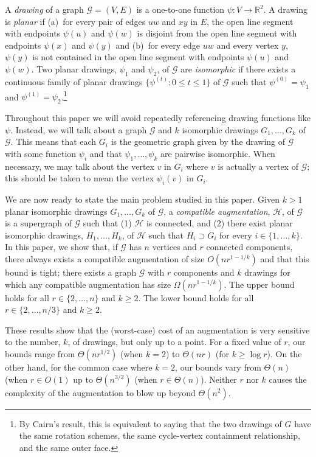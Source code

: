 \documentclass{patmorin}
\newcommand{\R}{\mathbb{R}}
\begin{document}
A \emph{drawing} of a graph $\mathcal{G}=(V,E)$ is a one-to-one
function $\psi\colon V\to\R^2$.  A drawing is \emph{planar} if (a)~for
every pair of edges $uw$ and $xy$ in $E$, the open line segment with
endpoints $\psi(u)$ and $\psi(w)$ is disjoint from the open line
segment with endpoints $\psi(x)$ and $\psi(y)$ and (b)~for every edge
$uw$ and every vertex $y$, $\psi(y)$ is not contained in the open line
segment with endpoints $\psi(u)$ and $\psi(w)$.  Two planar drawings,
$\psi_1$ and $\psi_2$, of $\mathcal{G}$ are \emph{isomorphic} if
there exists a continuous family of planar drawings $\{\psi^{(t)}
\colon 0\le t\le 1\}$ of $\mathcal{G}$ such that $\psi^{(0)}=\psi_1$
and $\psi^{(1)}=\psi_2$.\footnote{By Cairn's result, this is equivalent
to saying that the two drawings of $G$ have the same rotation schemes,
the same cycle-vertex containment relationship, and the same outer face.}


Throughout this paper we will avoid repeatedly referencing drawing
functions like $\psi$.  Instead, we will talk about a graph $\mathcal{G}$
and $k$ isomorphic drawings $G_1,\ldots,G_k$ of $\mathcal G$.  This
means that each $G_i$ is the geometric graph given by the drawing of
$\mathcal{G}$ with some function $\psi_i$ and that $\psi_1,\ldots,\psi_k$
are pairwise isomorphic.  When necessary, we may talk about the vertex
$v$ in $G_i$ where $v$ is actually a vertex of $\mathcal{G}$; this should
be taken to mean the vertex $\psi_i(v)$ in $G_i$.

We are now ready to state the main problem studied in this paper.
Given $k>1$ planar isomorphic drawings $G_1, \ldots, G_k$
of $\mathcal G$, a \emph{compatible augmentation}, $\mathcal H$, of
$\mathcal G$ is a supergraph of $\mathcal G$ such that (1) $\mathcal H$
is connected, and (2) there exist planar isomorphic drawings,
$H_1, \ldots, H_k$, of $\mathcal H$ such that $H_i\supset G_i$ for every
$i\in\{1,\ldots,k\}$.  In this paper, we show that, if $\mathcal{G}$
has $n$ vertices and $r$ connected components, there always exists a
compatible augmentation of size $O(nr^{1-1/k})$ and that this bound
is tight; there exists a graph $\mathcal G$
with $r$ components and $k$ drawings for which any compatible augmentation
has size $\Omega(nr^{1-1/k})$.  The upper bound holds for all $r\in\{2,\ldots,n\}$ and $k\ge 2$. The lower bound holds for all $r\in\{2,\ldots,n/3\}$ and $k\ge 2$.

These results show that the (worst-case) cost of an augmentation is very
sensitive to the number, $k$, of drawings, but only up to a point.
For a fixed value of $r$, our bounds range from $\Theta(nr^{1/2})$ (when
$k=2$) to $\Theta(nr)$ (for $k\ge \log r$).  On the other hand, for the
common case where $k=2$, our bounds vary from $\Theta(n)$ (when $r\in
O(1)$ up to $\Theta(n^{3/2})$ (when $r\in\Theta(n)$).  Neither $r$ nor $k$
causes the complexity of the augmentation to blow up beyond $\Theta(n^2)$.
\end{document}
